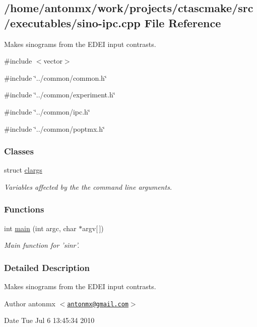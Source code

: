 \hypertarget{sino-ipc_8cpp}{
\subsection{/home/antonmx/work/projects/ctascmake/src/executables/sino-\/ipc.cpp File Reference}
\label{sino-ipc_8cpp}
}


Makes sinograms from the EDEI input contrasts.  


{\ttfamily \#include $<$vector$>$}\par
{\ttfamily \#include \char`\"{}../common/common.h\char`\"{}}\par
{\ttfamily \#include \char`\"{}../common/experiment.h\char`\"{}}\par
{\ttfamily \#include \char`\"{}../common/ipc.h\char`\"{}}\par
{\ttfamily \#include \char`\"{}../common/poptmx.h\char`\"{}}\par
\subsubsection*{Classes}
\begin{DoxyCompactItemize}
\item 
struct \hyperlink{structclargs}{clargs}
\begin{DoxyCompactList}\small\item\em Variables affected by the the command line arguments. \item\end{DoxyCompactList}\end{DoxyCompactItemize}
\subsubsection*{Functions}
\begin{DoxyCompactItemize}
\item 
int \hyperlink{sino-ipc_8cpp_a0ddf1224851353fc92bfbff6f499fa97}{main} (int argc, char $\ast$argv\mbox{[}$\,$\mbox{]})
\begin{DoxyCompactList}\small\item\em Main function for 'sinr'. \item\end{DoxyCompactList}\end{DoxyCompactItemize}


\subsubsection{Detailed Description}
Makes sinograms from the EDEI input contrasts. \begin{DoxyAuthor}{Author}
antonmx $<$\href{mailto:antonmx@gmail.com}{\tt antonmx@gmail.com}$>$ 
\end{DoxyAuthor}
\begin{DoxyDate}{Date}
Tue Jul 6 13:45:34 2010 
\end{DoxyDate}


